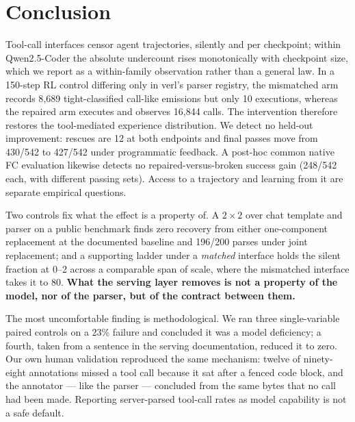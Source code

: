 \section{Conclusion}

Tool-call interfaces censor agent trajectories, silently and per checkpoint; within Qwen2.5-Coder
the absolute undercount rises monotonically with checkpoint size, which we report as a
within-family observation rather than a general law. In a 150-step RL control differing only in
verl's parser registry, the mismatched arm records 8{,}689 tight-classified call-like emissions but only 10 executions,
whereas the repaired arm executes and observes 16{,}844 calls. The intervention therefore restores
the tool-mediated experience distribution. We detect no held-out improvement: rescues are 12 at both endpoints
and final passes move from 430/542 to 427/542 under programmatic feedback. A post-hoc
common native FC evaluation likewise detects no repaired-versus-broken success gain
(248/542 each, with different passing sets). Access to a trajectory and learning from it are
separate empirical questions.

Two controls fix what the effect is a property of. A $2\times2$ over chat template and parser on a
public benchmark finds zero recovery from either one-component replacement at the documented
baseline and 196/200 parses under joint replacement; and a supporting ladder under a
\emph{matched} interface holds the silent fraction at 0--2 across
a comparable span of scale, where the mismatched interface takes it to 80. \textbf{What the serving
layer removes is not a property of the model, nor of the parser, but of the contract between them.}

The most uncomfortable finding is methodological. We ran three single-variable paired controls on a
23\% failure and concluded it was a model deficiency; a fourth, taken from a sentence in the serving
documentation, reduced it to zero. Our own human validation reproduced the same mechanism: twelve of
ninety-eight annotations missed a tool call because it sat after a fenced code block, and the
annotator --- like the parser --- concluded from the same bytes that no call had been made.
Reporting server-parsed tool-call rates as model capability is not a safe default.
